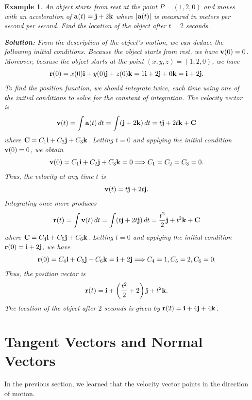 \documentclass[titlepage,a4paper,12pt]{report}
\newtheorem{example}{Example}[section]
\begin{document}
\begin{example}
An object starts from rest at the point $P=(1,2,0)$ and moves with an acceleration of ${\bf{a}}(t)={\bf{j}}+2{\bf{k}}$ where $|{\bf{a}}(t)|$ is measured in meters per second per second. Find the location of the object after $t=2$ seconds.

\noindent \textbf{Solution:} From the description of the object's motion, we can deduce the following \textit{initial conditions}. Because the object starts from rest, we have ${\bf{v}}(0)=0$. Moreover, because the object starts at the point $(x,y,z)=(1,2,0)$, we have 
\[{\bf{r}}(0)=x(0){\bf{i}}+y(0){\bf{j}}+z(0){\bf{k}}=1{\bf{i}}+2{\bf{j}}+0{\bf{k}}={\bf{i}}+2{\bf{j}}.\]
To find the position function, we should integrate twice, each time using one of the initial conditions to solve for the constant of integration. The velocity vector is 
\[{\bf{v}}(t)=\int {\bf{a}}(t)\, dt =\int ({\bf{j}}+2{\bf{k}})\, dt =t{\bf{j}}+2t{\bf{k}}+{\bf{C}}\] where ${\bf{C}}=C_1{\bf{i}}+C_2{\bf{j}}+C_3{\bf{k}}$. Letting $t=0$ and applying the initial condition ${\bf{v}}(0)=0$, we obtain
\[{\bf{v}}(0)=C_1{\bf{i}}+C_2{\bf{j}}+C_3{\bf{k}} =0 \Longrightarrow C_1=C_2=C_3=0.\] Thus, the velocity at any time $t$ is 
\[{\bf{v}}(t)=t{\bf{j}}+2t{\bf{j}}.\] Integrating once more produces 
\[{\bf{r}}(t)=\int {\bf{v}}(t)\, dt =\int (t{\bf{j}}+2t{\bf{j}})\, dt =\dfrac{t^2}{2}{\bf{j}}+t^2{\bf{k}}+{\bf{C}}\] where ${\bf{C}}=C_4{\bf{i}}+C_5{\bf{j}}+C_6{\bf{k}}$. Letting $t=0$ and applying the initial condition ${\bf{r}}(0)={\bf{i}}+2{\bf{j}}$, we have
\[{\bf{r}}(0)=C_4{\bf{i}}+C_5{\bf{j}}+C_6{\bf{k}} ={\bf{i}}+2{\bf{j}}\Longrightarrow C_4=1, C_5=2, C_6=0.\] Thus, the position vector is 
\[{\bf{r}}(t)={\bf{i}}+\left(\dfrac{t^2}{2}+2\right){\bf{j}}+t^2{\bf{k}}.\] The location of the object after $2$ seconds is given by ${\bf{r}}(2)={\bf{i}}+4{\bf{j}}+4{\bf{k}}$.
\end{example}
\section{Tangent Vectors and Normal Vectors}
In the previous section, we learned that the velocity vector points in the direction of motion. 
\end{document}
